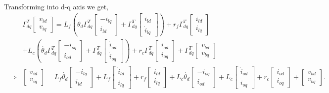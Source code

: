 Transforming into d-q axis we get,
\begin{align}\label{eq:q3_il_io_dq}
	&\Gamma_{dq}^T\begin{bmatrix}
		v_{id}\\v_{iq}
	\end{bmatrix} = L_f\left(\dot{\theta_d}\Gamma_{dq}^T\begin{bmatrix}
		-i_{lq}\\i_{ld}
	\end{bmatrix}+\Gamma_{dq}^T\begin{bmatrix}
		\dot{i}_{ld}\\ \dot{i}_{lq}
	\end{bmatrix}\right)+r_f\Gamma_{dq}^T\begin{bmatrix}
		i_{ld}\\i_{lq}
	\end{bmatrix}\nonumber\\
	&+L_c\left(\dot{\theta_d}\Gamma_{dq}^T\begin{bmatrix}
		-i_{oq}\\i_{od}
	\end{bmatrix}+\Gamma_{dq}^T\begin{bmatrix}
		\dot{i}_{od}\\ \dot{i}_{oq}
	\end{bmatrix}\right)+r_c\Gamma_{dq}^T\begin{bmatrix}
		i_{od}\\i_{oq}
	\end{bmatrix}+\Gamma_{dq}^T\begin{bmatrix}
		v_{bd}\\v_{bq}
	\end{bmatrix}\nonumber\\
	\implies & \begin{bmatrix}
	v_{id}\\v_{iq}
	\end{bmatrix} = L_f\dot{\theta_d}\begin{bmatrix}
	-i_{lq}\\i_{ld}
	\end{bmatrix}+L_f\begin{bmatrix}
	\dot{i}_{ld}\\ \dot{i}_{lq}
	\end{bmatrix}+r_f\begin{bmatrix}
	i_{ld}\\i_{lq}
	\end{bmatrix}+L_c\dot{\theta_d}\begin{bmatrix}
	-i_{oq}\\i_{od}
	\end{bmatrix}+L_c\begin{bmatrix}
	\dot{i}_{od}\\ \dot{i}_{oq}
	\end{bmatrix}+r_c\begin{bmatrix}
	i_{od}\\i_{oq}
	\end{bmatrix}+\begin{bmatrix}
	v_{bd}\\v_{bq}
	\end{bmatrix}.
\end{align}
